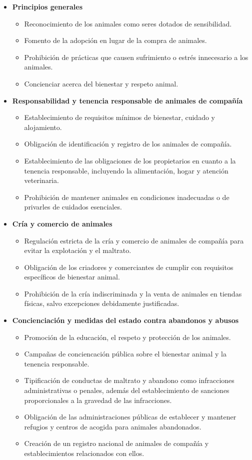 \documentclass[a4paper, 12pt]{article}
\begin{document}
\begin{itemize}[noitemsep]
\item \textbf{Principios generales}
	\begin{itemize}[noitemsep]
	\item Reconocimiento de los animales como seres dotados de sensibilidad.
	\item Fomento de la adopción en lugar de la compra de animales.
	\item Prohibición de prácticas que causen sufrimiento o estrés innecesario a los animales.
	\item Concienciar acerca del bienestar y respeto animal.
	\end{itemize}
\item \textbf{Responsabilidad y tenencia responsable de animales de compañía}
	\begin{itemize}[noitemsep]
	\item Establecimiento de requisitos mínimos de bienestar, cuidado y alojamiento.
	\item Obligación de identificación y registro de los animales de compañía.
	\item Establecimiento de las obligaciones de los propietarios en cuanto a la tenencia responsable, incluyendo la alimentación, hogar y atención veterinaria.
	\item Prohibición de mantener animales en condiciones inadecuadas o de privarles de cuidados esenciales.
	\end{itemize}
\item \textbf{Cría y comercio de animales}
	\begin{itemize}[noitemsep]
	\item Regulación estricta de la cría y comercio de animales de compañía para evitar la explotación y el maltrato.
	\item Obligación de los criadores y comerciantes de cumplir con requisitos específicos de bienestar animal.
	\item Prohibición de la cría indiscriminada y la venta de animales en tiendas físicas, salvo excepciones debidamente justificadas.
	\end{itemize}
\item \textbf{Concienciación y medidas del estado contra abandonos y abusos}
	\begin{itemize}[noitemsep]
	\item Promoción de la educación, el respeto y protección de los animales.
	\item Campañas de conciencación pública sobre el bienestar animal y la tenencia responsable.
	\item Tipificación de conductas de maltrato y abandono como infracciones administrativas o penales, además del establecimiento de sanciones proporcionales a la gravedad de las infracciones.
	\item Obligación de las administraciones públicas de establecer y mantener refugios y centros de acogida para animales abandonados.
	\item Creación de un registro nacional de animales de compañía y establecimientos relacionados con ellos.
	\end{itemize}
\end{itemize}
\end{document}
